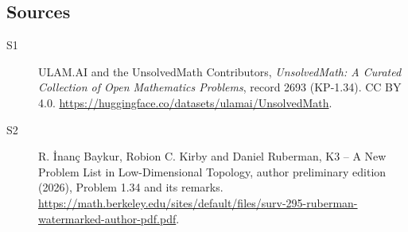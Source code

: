 \documentclass[11pt]{article}
\begin{document}
\subsection{Sources}
\begin{description}
\item[\hypertarget{source:2693:1}{S1}] ULAM.AI and the UnsolvedMath Contributors, \emph{UnsolvedMath: A Curated Collection of Open Mathematics Problems}, record 2693 (KP-1.34). CC BY 4.0. \url{https://huggingface.co/datasets/ulamai/UnsolvedMath}.
\item[\hypertarget{source:2693:2}{S2}] R. \.{I}nan\c{c} Baykur, Robion C. Kirby and Daniel Ruberman, K3 -- A New Problem List in Low-Dimensional Topology, author preliminary edition (2026), Problem 1.34 and its remarks. \url{https://math.berkeley.edu/sites/default/files/surv-295-ruberman-watermarked-author-pdf.pdf}.
\end{description}
\label{end:2693}
\end{document}
